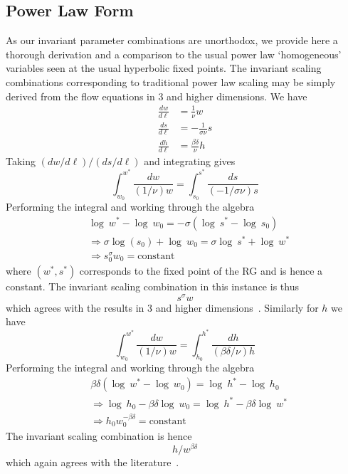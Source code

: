 \documentclass[reprint,amsmath,amssymb,aps,floatfix]{revtex4-1}
\begin{document}
\subsection{\label{app:powerlaw} Power Law Form}
%
As our invariant parameter combinations are unorthodox, we provide here a thorough derivation and a comparison to the usual power law `homogeneous' variables seen at the usual hyperbolic fixed points. The invariant scaling combinations corresponding to traditional power law scaling may be simply derived from the flow equations in 3 and higher dimensions. We have
%
\begin{equation}
	\begin{split}
		\frac{dw}{d\ell}&=\frac{1}{\nu} w\\
		\frac{ds}{d\ell}&=- \frac{1}{\sigma\nu}s\\
		\frac{dh}{d\ell}&=\frac{\beta\delta}{\nu}h
	\end{split}
\end{equation}
%
\noindent Taking $(dw/d\ell)/(ds/d\ell)$ and integrating gives
%
\begin{equation}
	\int_{w_0}^{w^*}\frac{dw}{(1/\nu) w} = \int_{s_0}^{s^*}\frac{ds}{(-1/\sigma\nu) s} 
\end{equation}
%
\noindent Performing the integral and working through the algebra
%
\begin{equation}
	\begin{split}
		&\log\ w^*-\log\ w_0 = -\sigma(\log\ s^*-\log\ s_0)\\
		&\Rightarrow  \sigma \log(s_0)+ \log\ w_0= \sigma \log\ s^*+\log\ w^*\\
		&\Rightarrow s_0^\sigma w_0=\textrm{constant}
	\end{split}
\end{equation}
%
\noindent where $(w^*, s^*)$ corresponds to the fixed point of the RG and is hence a constant. The invariant scaling combination in this instance is thus
%
\begin{equation}
	s^\sigma w
\end{equation}
%
which agrees with the results in 3 and higher dimensions~\cite{Perkovic96}. Similarly for $h$ we have
%
\begin{equation}
	\int_{w_0}^{w^*}\frac{dw}{(1/\nu) w} = \int_{h_0}^{h^*}\frac{dh}{(\beta\delta/\nu) h} 
\end{equation}
%
\noindent Performing the integral and working through the algebra
%
\begin{equation}
	\begin{split}
		&\beta\delta(\log\ w^*-\log\ w_0) = \log\ h^*-\log\ h_0\\
		&\Rightarrow  \log\ h_0 - \beta\delta \log\ w_0= \log\ h^*- \beta\delta \log\ w^*\\
		&\Rightarrow h_0 w_0^{-\beta\delta}=\textrm{constant}
	\end{split}
\end{equation}
%
\noindent The invariant scaling combination is hence
%
\begin{equation}
	h/ w^{\beta\delta}
\end{equation}
%
\noindent which again agrees with the literature~\cite{Perkovic96}.
%
\end{document}
